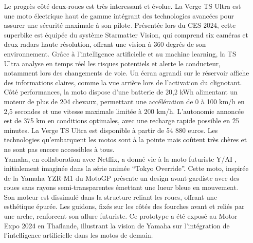 Le progrès côté deux-roues est très interessant et évolue.
La Verge TS Ultra est une moto électrique \cite{lenoir_cette_2024} haut de gamme intégrant des technologies avancées pour assurer une sécurité maximale à son pilote. Présentée lors du CES 2024, cette superbike est équipée du système Starmatter Vision, qui comprend six caméras et deux radars haute résolution, offrant une vision à 360 degrés de son environnement. Grâce à l’intelligence artificielle et au machine learning, la TS Ultra analyse en temps réel les risques potentiels et alerte le conducteur, notamment lors des changements de voie. Un écran agrandi sur le réservoir affiche des informations claires, comme la vue arrière lors de l’activation du clignotant. Côté performances, la moto dispose d’une batterie de 20,2 kWh alimentant un moteur de plus de 204 chevaux, permettant une accélération de 0 à 100 km/h en 2,5 secondes et une vitesse maximale limitée à 200 km/h. L’autonomie annoncée est de 375 km en conditions optimales, avec une recharge rapide possible en 25 minutes. La Verge TS Ultra est disponible à partir de 54 880 euros.
Les technologies qu'embarquent les motos sont à la pointe mais coûtent très chères et ne sont pas encore accessibles à tous.
\\
Yamaha, en collaboration avec Netflix, a donné vie à la moto futuriste Y/AI \cite{texier_quand_2024} , initialement imaginée dans la série animée “Tokyo Override”. Cette moto, inspirée de la Yamaha YZR-M1 du MotoGP présente un design avant-gardiste avec des roues sans rayons semi-transparentes émettant une lueur bleue en mouvement. Son moteur est dissimulé dans la structure reliant les roues, offrant une esthétique épurée. Les guidons, fixés sur les côtés des fourches avant et reliés par une arche, renforcent son allure futuriste. Ce prototype a été exposé au Motor Expo 2024 en Thaïlande, illustrant la vision de Yamaha sur l’intégration de l’intelligence artificielle dans les motos de demain.\\

